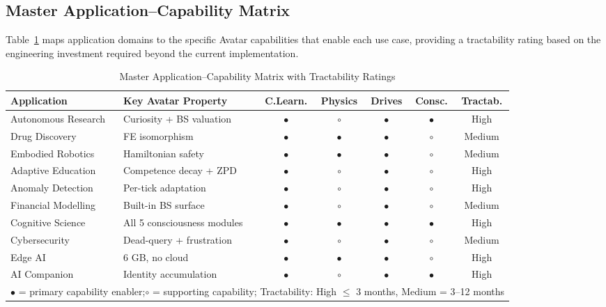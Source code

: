 \documentclass[12pt,a4paper]{article}
\begin{document}
\subsection{Master Application--Capability Matrix}

Table~\ref{tab:master} maps application domains to the specific Avatar capabilities that
enable each use case, providing a tractability rating based on the engineering investment
required beyond the current implementation.

\begin{table}[H]
\centering
\caption{Master Application--Capability Matrix with Tractability Ratings}
\label{tab:master}
\footnotesize
\renewcommand{\arraystretch}{1.35}
\begin{tabularx}{\textwidth}{p{3.2cm}p{3.0cm}ccccc}
\toprule
\textbf{Application} &
\textbf{Key Avatar Property} &
\textbf{C.Learn.} &
\textbf{Physics} &
\textbf{Drives} &
\textbf{Consc.} &
\textbf{Tractab.} \\
\midrule
Autonomous Research & Curiosity + BS valuation & $\bullet$ & $\circ$ & $\bullet$ & $\bullet$ & High \\
\rowcolor{rowalt}
Drug Discovery & FE isomorphism & $\bullet$ & $\bullet$ & $\bullet$ & $\circ$ & Medium \\
Embodied Robotics & Hamiltonian safety & $\bullet$ & $\bullet$ & $\bullet$ & $\circ$ & Medium \\
\rowcolor{rowalt}
Adaptive Education & Competence decay + ZPD & $\bullet$ & $\circ$ & $\bullet$ & $\circ$ & High \\
Anomaly Detection & Per-tick adaptation & $\bullet$ & $\circ$ & $\bullet$ & $\circ$ & High \\
\rowcolor{rowalt}
Financial Modelling & Built-in BS surface & $\bullet$ & $\circ$ & $\bullet$ & $\circ$ & Medium \\
Cognitive Science & All 5 consciousness modules & $\bullet$ & $\bullet$ & $\bullet$ & $\bullet$ & High \\
\rowcolor{rowalt}
Cybersecurity & Dead-query + frustration & $\bullet$ & $\circ$ & $\bullet$ & $\circ$ & Medium \\
Edge AI & 6 GB, no cloud & $\bullet$ & $\bullet$ & $\bullet$ & $\circ$ & High \\
\rowcolor{rowalt}
AI Companion & Identity accumulation & $\bullet$ & $\circ$ & $\bullet$ & $\bullet$ & High \\
\midrule
\multicolumn{7}{l}{\footnotesize $\bullet$ = primary capability enabler;\quad $\circ$ = supporting capability;\quad
Tractability: High $\leq$ 3 months, Medium = 3--12 months}\\
\bottomrule
\end{tabularx}
\end{table}
\end{document}
